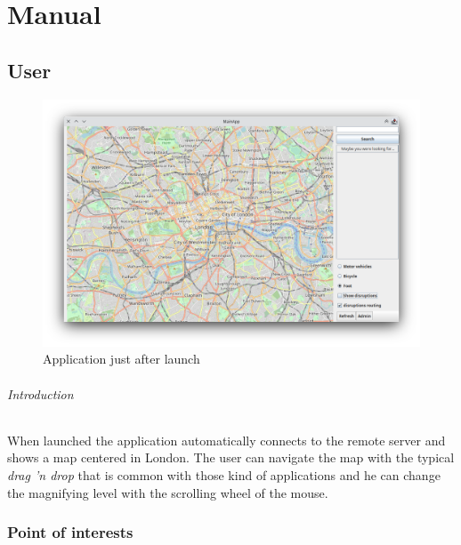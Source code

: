 \part{Manual}

\chapter{User}

\begin{figure}[H]
	\centering
	\includegraphics[width=\linewidth]{assets/mainapp0}
	\caption[]{Application just after launch}
	\label{fig:mainapp0}
\end{figure}

\paragraph{Introduction}
When launched the application automatically connects to the remote server and 
shows a map centered in London. The user can navigate the map with the typical 
\textit{drag 'n drop} that is common with those kind of applications and he can 
change the magnifying level with the scrolling wheel of the mouse.

\section{Point of interests}

